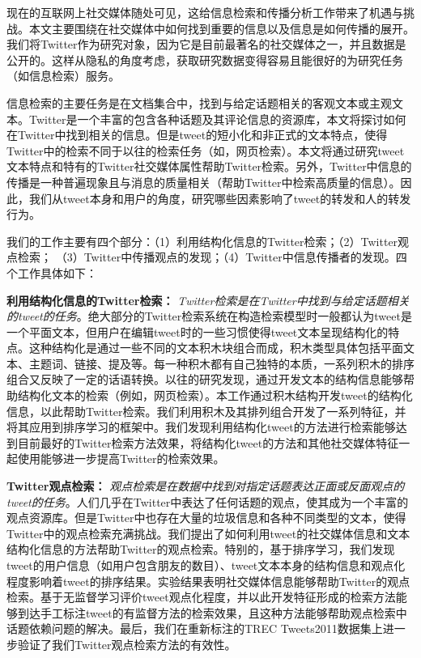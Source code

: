 \begin{cabstract}
现在的互联网上社交媒体随处可见，这给信息检索和传播分析工作带来了机遇与挑战。本文主要围绕在社交媒体中如何找到重要的信息以及信息是如何传播的展开。我们将Twitter作为研究对象，因为它是目前最著名的社交媒体之一，并且数据是公开的。这样从隐私的角度考虑，获取研究数据变得容易且能很好的为研究任务（如信息检索）服务。

信息检索的主要任务是在文档集合中，找到与给定话题相关的客观文本或主观文本。Twitter是一个丰富的包含各种话题及其评论信息的资源库，本文将探讨如何在Twitter中找到相关的信息。但是tweet的短小化和非正式的文本特点，使得Twitter中的检索不同于以往的检索任务（如，网页检索）。本文将通过研究tweet文本特点和特有的Twitter社交媒体属性帮助Twitter检索。另外，Twitter中信息的传播是一种普遍现象且与消息的质量相关（帮助Twitter中检索高质量的信息）。因此，我们从tweet本身和用户的角度，研究哪些因素影响了tweet的转发和人的转发行为。

我们的工作主要有四个部分：（1）利用结构化信息的Twitter检索；（2）Twitter观点检索； （3）Twitter中传播观点的发现；（4）Twitter中信息传播者的发现。四个工作具体如下：

\textbf{利用结构化信息的Twitter检索：} \emph{Twitter检索是在Twitter中找到与给定话题相关的tweet的任务}。绝大部分的Twitter检索系统在构造检索模型时一般都认为tweet是一个平面文本，但用户在编辑tweet时的一些习惯使得tweet文本呈现结构化的特点。这种结构化是通过一些不同的文本积木块组合而成，积木类型具体包括平面文本、主题词、链接、提及等。每一种积木都有自己独特的本质，一系列积木的排序组合又反映了一定的话语转换。以往的研究发现，通过开发文本的结构信息能够帮助结构化文本的检索（例如，网页检索）。本工作通过积木结构开发tweet的结构化信息，以此帮助Twitter检索。我们利用积木及其排列组合开发了一系列特征，并将其应用到排序学习的框架中。我们发现利用结构化tweet的方法进行检索能够达到目前最好的Twitter检索方法效果，将结构化tweet的方法和其他社交媒体特征一起使用能够进一步提高Twitter的检索效果。

\textbf{Twitter观点检索：} \emph{观点检索是在数据中找到对指定话题表达正面或反面观点的tweet的任务}。人们几乎在Twitter中表达了任何话题的观点，使其成为一个丰富的观点资源库。但是Twitter中也存在大量的垃圾信息和各种不同类型的文本，使得Twitter中的观点检索充满挑战。我们提出了如何利用tweet的社交媒体信息和文本结构化信息的方法帮助Twitter的观点检索。特别的，基于排序学习，我们发现tweet的用户信息（如用户包含朋友的数目）、tweet文本本身的结构信息和观点化程度影响着tweet的排序结果。实验结果表明社交媒体信息能够帮助Twitter的观点检索。基于无监督学习评价tweet观点化程度，并以此开发特征形成的检索方法能够到达手工标注tweet的有监督方法的检索效果，且这种方法能够帮助观点检索中话题依赖问题的解决。最后，我们在重新标注的TREC Tweets2011数据集上进一步验证了我们Twitter观点检索方法的有效性。


\end{cabstract}
